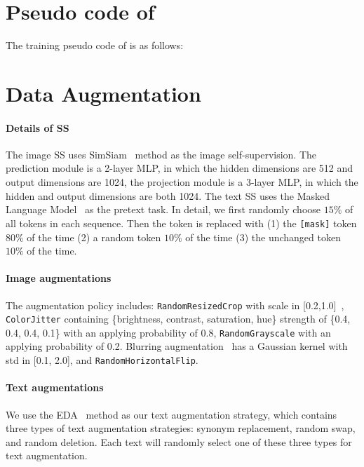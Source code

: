 \clearpage
\appendix

\section{Pseudo code of \workname}\label{Pseudo Code}
The training pseudo code of \workname  is as follows:


\section{Data Augmentation}\label{data_aug}

\paragraph{Details of SS} The image SS uses SimSiam~\citep{chen2021exploring} method as the image self-supervision. The prediction module is a 2-layer MLP, in which the hidden dimensions are 512 and output dimensions are 1024, the projection module is a 3-layer MLP, in which the hidden and output dimensions are both 1024. The text SS uses the Masked Language Model~\citep{devlin2018bert} as the pretext task. In detail, we first randomly choose $15\%$ of all tokens in each sequence. Then the token is replaced with (1) the \texttt{[mask]} token $80\%$ of the time (2) a random token $10\%$ of the time (3) the unchanged token $10\%$ of the time.

\paragraph{Image augmentations} The augmentation policy includes: \texttt{RandomResizedCrop} with scale in [0.2,1.0]~\citep{wu2018unsupervised}, \texttt{ColorJitter} containing \{brightness, contrast, saturation, hue\} strength of \{0.4, 0.4, 0.4, 0.1\} with an applying probability of 0.8, \texttt{RandomGrayscale} with an applying probability of 0.2. Blurring augmentation~\citep{chen2020simple} has a Gaussian kernel with std in [0.1, 2.0], and \texttt{RandomHorizontalFlip}.

\paragraph{Text augmentations} We use the EDA~\citep{wei2019eda} method as our text augmentation strategy, which contains three types of text augmentation strategies: synonym replacement, random swap, and random deletion. Each text will randomly select one of these three types for text augmentation.



